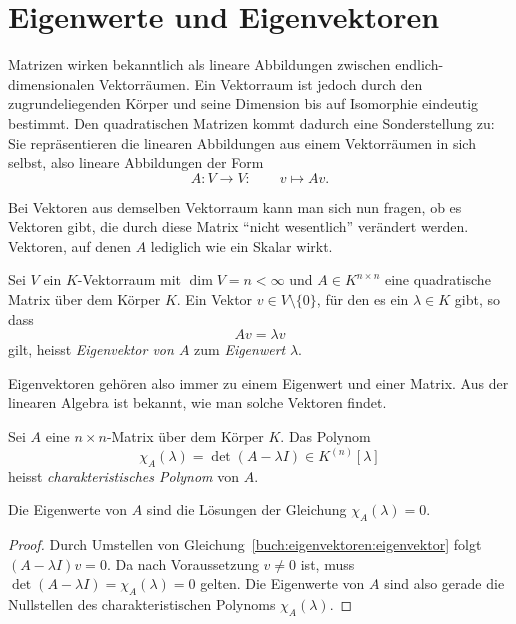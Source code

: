 %
%
%
\chapter{Eigenwerte und Eigenvektoren
\label{buch:chapter:eigenwerte-und-eigenvektoren}}
\rhead{}

Matrizen wirken bekanntlich als lineare Abbildungen zwischen endlich-dimensionalen Vektorräumen.
Ein Vektorraum ist jedoch durch den zugrundeliegenden Körper und seine Dimension bis auf Isomorphie eindeutig bestimmt. %
Den quadratischen Matrizen kommt dadurch eine Sonderstellung zu:
Sie repräsentieren die linearen Abbildungen aus einem Vektorräumen in sich selbst,
also lineare Abbildungen der Form
\[A \colon V \to V \colon \qquad v \mapsto Av.\]

Bei Vektoren aus demselben Vektorraum kann man sich nun fragen,
ob es Vektoren gibt,
die durch diese Matrix ``nicht wesentlich'' verändert werden.
Vektoren, auf denen $A$ lediglich wie ein Skalar wirkt.

\begin{definition}
  Sei $V$ ein $K$-Vektorraum mit $\dim V = n < \infty$
  und $A\in K^{n\times n}$ eine quadratische Matrix über dem Körper $K$.
  Ein Vektor $v \in V \setminus \{0\}$, für den es ein $\lambda \in K$ gibt, so dass
  \begin{equation}
    Av = \lambda v \label{buch:eigenvektoren:eigenvektor}
  \end{equation}
  gilt, heisst \emph{Eigenvektor von $A$} zum \emph{Eigenwert} $\lambda$.
\end{definition}

Eigenvektoren gehören also immer zu einem Eigenwert und einer Matrix.
Aus der linearen Algebra ist bekannt,
wie man solche Vektoren findet.

\begin{definition}
  Sei $A$ eine $n\times n$-Matrix über dem Körper $K$.
  Das Polynom
  \[ \chi_A(\lambda) = \det (A - \lambda I) \in K^{(n)}[\lambda]\]
  heisst \emph{charakteristisches Polynom} von $A$.
\end{definition}

\begin{satz}
  Die Eigenwerte von $A$ sind die Lösungen der Gleichung $ \chi_A(\lambda) = 0$.
\end{satz}
\begin{proof}
  Durch Umstellen von Gleichung~\eqref{buch:eigenvektoren:eigenvektor} folgt
  $(A -\lambda I)v = 0$.
  Da nach Voraussetzung $v \ne 0$ ist, muss $\det(A-\lambda I) = \chi_A(\lambda) = 0$ gelten.
  Die Eigenwerte von $A$ sind also gerade die Nullstellen des charakteristischen Polynoms $\chi_A(\lambda)$.
\end{proof}

